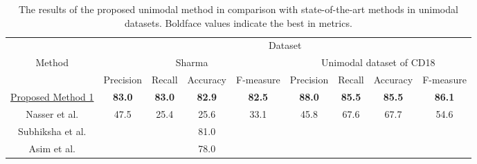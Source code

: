 \documentclass{svjour3}                     \smartqed  \usepackage{graphicx}
\begin{document}
\begin{table}[]
    \centering
    \caption{The results of the proposed unimodal method in comparison with state-of-the-art methods in unimodal datasets. Boldface values indicate the best in metrics.}
    \label{tbl:unimodal_evaluation}
    \begin{tabular}{c|cccc|cccc}
        &\multicolumn{8}{c}{Dataset}    \\
        \cline{2-9}
        \multirow{2}{*}{Method} &\multicolumn{4}{c|}{Sharma \cite{Sharma}}   &\multicolumn{4}{c}{Unimodal dataset of CD18}   \\
        &Precision  &Recall  &Accuracy  &F-measure  &Precision  &Recall &Accuracy   &F-measure  \\
        \hline
        \hyperref[Subsec:model_1]{Proposed Method 1} &\textbf{83.0}   &\textbf{83.0}   &\textbf{82.9}   &\textbf{82.5}   &\textbf{88.0}  &\textbf{85.5}   &\textbf{85.5}  &\textbf{86.1}   \\
Nasser et al. \cite{Nasser2019} &47.5   &25.4   &25.6   &33.1   &45.8   &67.6   &67.7   &54.6   \\
        Subhiksha et al. \cite{Subhiksha2020}   &   &   &81.0   &   &   &   &   &   \\
        Asim et al. \cite{Asim2018} &   &   &78.0 &   &   &   &   & \\
        \hline
    \end{tabular}
\end{table}
\end{document}
